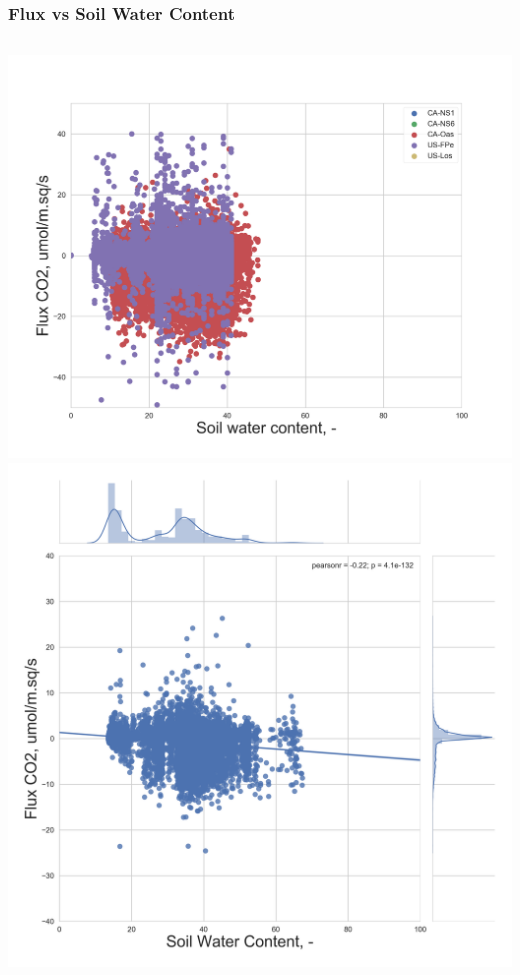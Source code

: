 \documentclass{beamer}
\begin{document}
\begin{frame}
\frametitle{Flux vs Soil Water Content}

\begin{columns}[t]
\centering
\includegraphics[width=\textwidth]{FvsSWC/all.png}\\
\includegraphics[width=\textwidth]{FvsSWC/CA-NS1.png}

\end{columns}
\end{frame}
\end{document}
